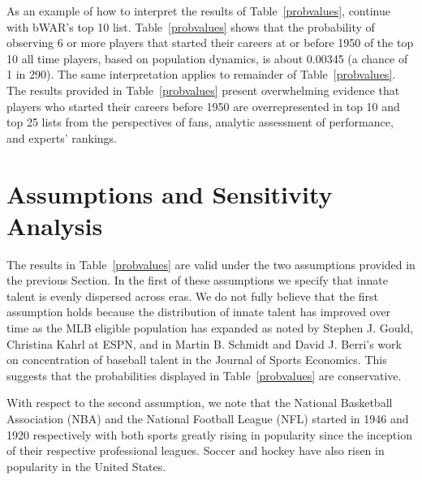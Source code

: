 \documentclass[11pt]{article}\usepackage[]{graphicx}\usepackage[]{color}
\begin{document}
As an example of how to interpret the results of Table~\ref{probvalues}, 
continue with bWAR's top 10 list.  Table~\ref{probvalues} shows that the 
probability of observing 6 or more players that started their careers at 
or before 1950 of the top 10 all time players, based on population 
dynamics, is about 0.00345 
(a chance of 1 in 290).
The same interpretation applies to remainder of Table~\ref{probvalues}.  
The results provided in Table~\ref{probvalues} present overwhelming evidence 
that players who started their careers before 1950 are overrepresented in top 
10 and top 25 lists from the perspectives of fans, analytic assessment of 
performance, and experts' rankings.  %




\section{Assumptions and Sensitivity Analysis}
\label{sec:Assumptions}

The results in Table~\ref{probvalues} are valid 
under the two assumptions provided in the previous Section.  In the first of 
these assumptions we specify that innate talent is evenly dispersed across 
eras. 
We do not fully believe that the first assumption holds because the 
distribution of innate talent has improved over time as the MLB eligible  
population has expanded as noted by Stephen J. Gould,  
Christina Kahrl at ESPN, and in 
Martin B. Schmidt and David J. Berri's work on concentration of baseball 
talent in the Journal of Sports Economics.
This suggests that the probabilities displayed in Table~\ref{probvalues} are 
conservative.  %

With respect to the second assumption, we note that the 
National Basketball Association (NBA) and the National Football League (NFL) 
started in 1946 and 1920 respectively %
with both sports greatly rising in popularity since the inception of their 
respective professional leagues.  Soccer and hockey have also risen in 
popularity in the United States.  
\end{document}
